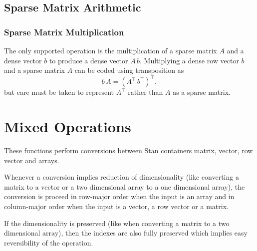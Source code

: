 \section{Sparse Matrix Arithmetic}

\subsection{Sparse Matrix Multiplication}

The only supported operation is the multiplication of a sparse matrix
$A$ and a dense vector $b$ to produce a dense vector $A\,b$.
Multiplying a dense row vector $b$ and a sparse matrix $A$ 
can be coded using transposition as
\[
b \, A = (A^{\top} \, b^{\top})^{\top},
\]
but care must be taken to represent $A^{\top}$ rather than $A$ as a
sparse matrix.

\begin{description}
\end{description}



\chapter{Mixed Operations}\label{mixed-operations.chapter}

These functions perform conversions between Stan containers matrix,
vector, row vector and arrays.

Whenever a conversion implies reduction of dimensionality (like
converting a matrix to a vector or a two dimensional array to a one
dimensional array), the conversion is proceed in row-major order when
the input is an array and in column-major order when the input is a
vector, a row vector or a matrix.

If the dimensionality is preserved (like when converting a matrix to a
two dimensional array), then the indexes are also fully preserved
which implies easy reversibility of the operation.

